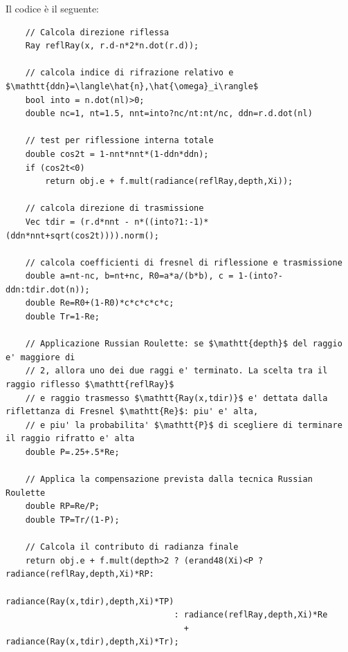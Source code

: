 Il codice \`e il seguente:
\begin{verbatim}
	// Calcola direzione riflessa
	Ray reflRay(x, r.d-n*2*n.dot(r.d));

	// calcola indice di rifrazione relativo e $\mathtt{ddn}=\langle\hat{n},\hat{\omega}_i\rangle$
	bool into = n.dot(nl)>0;
	double nc=1, nt=1.5, nnt=into?nc/nt:nt/nc, ddn=r.d.dot(nl)

	// test per riflessione interna totale
	double cos2t = 1-nnt*nnt*(1-ddn*ddn);
	if (cos2t<0)
		return obj.e + f.mult(radiance(reflRay,depth,Xi));

	// calcola direzione di trasmissione
	Vec tdir = (r.d*nnt - n*((into?1:-1)*(ddn*nnt+sqrt(cos2t)))).norm();

	// calcola coefficienti di fresnel di riflessione e trasmissione
	double a=nt-nc, b=nt+nc, R0=a*a/(b*b), c = 1-(into?-ddn:tdir.dot(n));
	double Re=R0+(1-R0)*c*c*c*c*c;
	double Tr=1-Re;

	// Applicazione Russian Roulette: se $\mathtt{depth}$ del raggio e' maggiore di
	// 2, allora uno dei due raggi e' terminato. La scelta tra il raggio riflesso $\mathtt{reflRay}$
	// e raggio trasmesso $\mathtt{Ray(x,tdir)}$ e' dettata dalla riflettanza di Fresnel $\mathtt{Re}$: piu' e' alta,
	// e piu' la probabilita' $\mathtt{P}$ di scegliere di terminare il raggio rifratto e' alta
	double P=.25+.5*Re;

	// Applica la compensazione prevista dalla tecnica Russian Roulette
	double RP=Re/P;
	double TP=Tr/(1-P);

	// Calcola il contributo di radianza finale
	return obj.e + f.mult(depth>2 ? (erand48(Xi)<P ? radiance(reflRay,depth,Xi)*RP:
	                                                 radiance(Ray(x,tdir),depth,Xi)*TP)
	                              : radiance(reflRay,depth,Xi)*Re 
	                                + radiance(Ray(x,tdir),depth,Xi)*Tr);
\end{verbatim}
